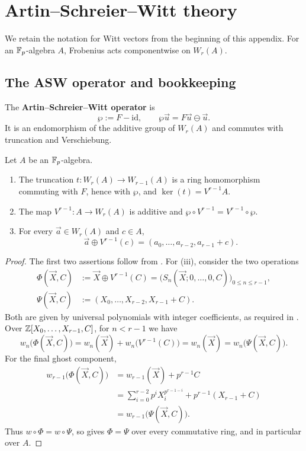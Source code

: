\section{Artin--Schreier--Witt theory}
\label{appendix:asw_development}

We retain the notation for Witt vectors from the beginning of this appendix.
For an $\mathbb{F}_p$-algebra $A$, Frobenius acts componentwise on $W_r(A)$.

\subsection{The ASW operator and bookkeeping}

\begin{definition}\label{definition:asw_operator}
The \textbf{Artin--Schreier--Witt operator} is
\[
\wp:=F-\mathrm{id},\qquad
\wp\vec u=F\vec u\ominus\vec u.
\]
It is an endomorphism of the additive group of $W_r(A)$ and commutes with
truncation and Verschiebung.
\end{definition}

\begin{lemma}\label{lemma:witt_bookkeeping}
Let $A$ be an $\mathbb{F}_p$-algebra.
\begin{enumerate}[label=(\roman*)]
    \item The truncation $t:W_r(A)\to W_{r-1}(A)$ is a ring homomorphism
    commuting with $F$, hence with $\wp$, and
    $\ker(t)=V^{r-1}A$.
    \item The map $V^{r-1}:A\to W_r(A)$ is additive and
    $\wp\circ V^{r-1}=V^{r-1}\circ\wp$.
    \item For every $\vec a\in W_r(A)$ and $c\in A$,
    \[
    \vec a\oplus V^{r-1}(c)
    =(a_0,\dots,a_{r-2},a_{r-1}+c).
    \]
\end{enumerate}
\end{lemma}

\begin{proof}
The first two assertions follow from
. For (iii), consider the two operations
\[
\begin{aligned}
 \Phi(\vec X,C)
 &:=\vec X\oplus V^{r-1}(C)
   =\bigl(S_n(\vec X;0,\dots,0,C)\bigr)_{0\leq n\leq r-1},\\
 \Psi(\vec X,C)
 &:=(X_0,\dots,X_{r-2},X_{r-1}+C).
\end{aligned}
\]
Both are given by universal polynomials with integer coefficients, as required
in . Over
$\mathbb{Z}[X_0,\dots,X_{r-1},C]$, for $n<r-1$ we have
\[
 w_n\bigl(\Phi(\vec X,C)\bigr)
 =w_n(\vec X)+w_n\bigl(V^{r-1}(C)\bigr)
 =w_n(\vec X)
 =w_n\bigl(\Psi(\vec X,C)\bigr).
\]
For the final ghost component,
\[
\begin{aligned}
 w_{r-1}\bigl(\Phi(\vec X,C)\bigr)
 &=w_{r-1}(\vec X)+p^{r-1}C\\
 &=\sum_{i=0}^{r-2}p^iX_i^{p^{r-1-i}}
   +p^{r-1}(X_{r-1}+C)\\
 &=w_{r-1}\bigl(\Psi(\vec X,C)\bigr).
\end{aligned}
\]
Thus $w\circ\Phi=w\circ\Psi$, so
 gives $\Phi=\Psi$ over every commutative ring,
and in particular over $A$.
\end{proof}

